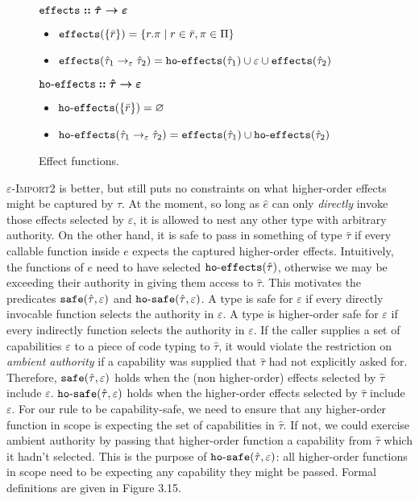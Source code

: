 \begin{figure}[h]

$\bm{\mathtt{effects :: \hat \tau \rightarrow \varepsilon}}$ \begin{itemize}
	\setlength\itemsep{-0.7em}
	\item[] $\mathtt{effects}(\{ \bar r \}) = \{ r.\pi \mid r \in \bar r, \pi \in \Pi \}$
	\item[] $\mathtt{effects}(\hat \tau_1 \rightarrow_{\varepsilon} \hat \tau_2) = \mathtt{ho \hbox{-} effects}(\hat \tau_1) \cup \varepsilon \cup \mathtt{effects}(\hat \tau_2)$
\end{itemize}

$\bm{\mathtt{ho \hbox{-} effects} :: \hat \tau \rightarrow \varepsilon}$ \begin{itemize}
	\setlength\itemsep{-0.7em}
	\item[] $\mathtt{ho \hbox{-} effects}(\{ \bar r \}) = \varnothing$
	\item[] $\mathtt{ho \hbox{-} effects}(\hat \tau_1 \rightarrow_{\varepsilon} \hat \tau_2) = \mathtt{effects}(\hat \tau_1) \cup \mathtt{ho \hbox{-} effects}(\hat \tau_2)$
\end{itemize}

\vspace{-7pt}
\caption{Effect functions.}
\label{This is the label.}
\end{figure}

\textsc{$\varepsilon$-Import2} is better, but still puts no constraints on what higher-order effects might be captured by $\hat \tau$. At the moment, so long as $\hat e$ can only \textit{directly} invoke those effects selected by $\varepsilon$, it is allowed to nest any other type with arbitrary authority. On the other hand, it is safe to pass in something of type $\hat \tau$ if every callable function inside $e$ expects the captured higher-order effects. Intuitively, the functions of $e$ need to have selected $\mathtt{ho \hbox{-} effects}(\hat \tau)$, otherwise we may be exceeding their authority in giving them access to $\hat \tau$. This motivates the predicates $\mathtt{safe}(\hat \tau, \varepsilon)$ and $\mathtt{ho \hbox{-} safe}(\hat \tau, \varepsilon)$. A type is safe for $\varepsilon$ if every directly invocable function selects the authority in $\varepsilon$. A type is higher-order safe for $\varepsilon$ if every indirectly function selects the authority in $\varepsilon$. If the caller supplies a set of capabilities $\varepsilon$ to a piece of code typing to $\hat \tau$, it would violate the restriction on \textit{ambient authority} if a capability was supplied that $\hat \tau$ had not explicitly asked for. Therefore, $\mathtt{safe}(\hat \tau, \varepsilon)$ holds when the (non higher-order) effects selected by $\hat \tau$ include $\varepsilon$. $\mathtt{ho \hbox{-} safe}(\hat \tau, \varepsilon)$ holds when the higher-order effects selected by $\hat  \tau$ include $\varepsilon$. For our rule to be capability-safe, we need to ensure that any higher-order function in scope is expecting the set of capabilities in $\hat \tau$. If not, we could exercise ambient authority by passing that higher-order function a capability from $\hat \tau$ which it hadn't selected. This is the purpose of $\mathtt{ho \hbox{-} safe}(\hat \tau, \varepsilon)$: all higher-order functions in scope need to be expecting any capability they might be passed. Formal definitions are given in Figure 3.15. 

